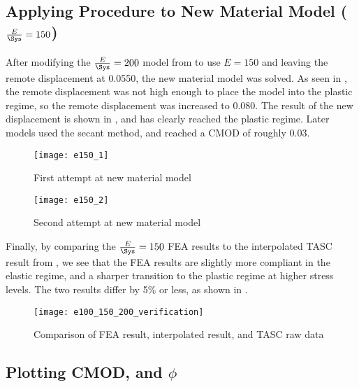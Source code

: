 \subsection{Applying Procedure to New Material Model (\(\frac{E}{\Sys} = 150\))}

After modifying the \(\frac{E}{\Sys} = 200\) model from  to use \(E = 150\) and leaving the remote displacement at 0.0550, the new material model was solved.
As seen in , the remote displacement was not high enough to place the model into the plastic regime, so the remote displacement was increased to 0.080.
The result of the new displacement is shown in , and has clearly reached the plastic regime.
Later models used the secant method, and reached a CMOD of roughly 0.03.
\begin{frame}
\begin{figure}[tbp]
\centering
\texttt{[image: e150\_1]}
\caption{\label{fig:e150_1} First attempt at new material model}
\end{figure}
\end{frame}
\begin{frame}
\begin{figure}[tbp]
\centering
\texttt{[image: e150\_2]}
\caption{\label{fig:e150_2} Second attempt at new material model}
\end{figure}
\end{frame}

Finally, by comparing the \(\frac{E}{\Sys} = 150\) FEA results to the interpolated TASC result from , we see that the FEA results are slightly more compliant in the elastic regime, and a sharper transition to the plastic regime at higher stress levels.
The two results differ by 5\% or less, as shown in .
\begin{frame}
\begin{figure}[tbp]
\centering
\texttt{[image: e100\_150\_200\_verification]}
\caption{\label{fig:e100_150_200_verification} Comparison of FEA result, interpolated result, and TASC raw data}
\end{figure}
\end{frame}

\subsection{Plotting CMOD, \J and \(\phi\)}

